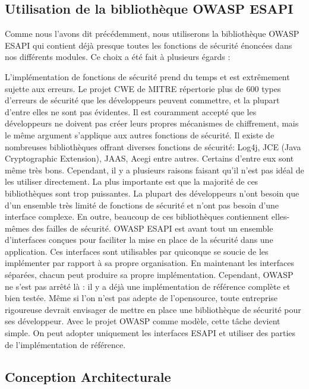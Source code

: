 \subsection{Utilisation de la bibliothèque OWASP ESAPI}
Comme nous l'avons dit précédemment, nous utiliserons la bibliothèque OWASP ESAPI qui contient déjà presque toutes les fonctions de sécurité énoncées dans nos différents modules. Ce choix a été fait à plusieurs égards :
\begin{itemize}
	\itemtirait L'implémentation de fonctions de sécurité prend du temps et est extrêmement sujette aux erreurs. Le projet CWE de MITRE répertorie plus de 600 types d’erreurs de sécurité que les développeurs peuvent commettre, et la plupart d’entre elles ne sont pas évidentes. Il est couramment accepté que les développeurs ne doivent pas créer leurs propres mécanismes de chiffrement, mais le même argument s'applique aux autres fonctions de sécurité.
	\itemtirait Il existe de nombreuses bibliothèques offrant diverses fonctions de sécurité: Log4j, JCE (Java Cryptographic Extension), JAAS, Acegi entre autres. Certains d'entre eux sont même très bons. Cependant, il y a plusieurs raisons faisant qu'il n'est pas idéal de les utiliser directement. La plus importante est que la majorité de ces bibliothèques sont trop puissantes. La plupart des développeurs n’ont besoin que d’un ensemble très limité de fonctions de sécurité et n’ont pas besoin d’une interface complexe. En outre, beaucoup de ces bibliothèques contiennent elles-mêmes des failles de sécurité.
	\itemtirait OWASP ESAPI est avant tout un ensemble d'interfaces conçues pour faciliter la mise en place de la sécurité dans une application. Ces interfaces sont utilisables par quiconque se soucie de les implémenter par rapport à sa propre organisation. En maintenant les interfaces séparées, chacun peut produire sa propre implémentation. Cependant, OWASP ne s'est pas arrêté là : il y a déjà une implémentation de référence complète et bien testée.
	\itemtirait Même si l'on n'est pas adepte de l'opensource, toute entreprise rigoureuse devrait envisager de mettre en place une bibliothèque de sécurité pour ses développeur. Avec le projet OWASP comme modèle, cette tâche devient simple. On peut adopter uniquement les interfaces ESAPI et utiliser des parties de l’implémentation de référence.
\end{itemize}
\subsection{Conception Architecturale}
